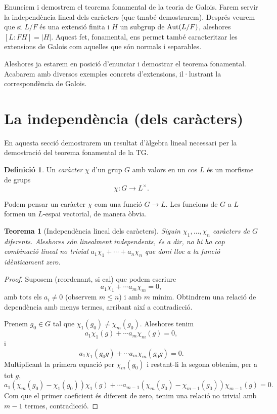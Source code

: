 \documentclass[
]{book}
\newtheorem{theorem}{Teorema}[chapter]
\theoremstyle{definition}
\newtheorem{definition}{Definició}[chapter]
\theoremstyle{definition}
\theoremstyle{definition}
\theoremstyle{definition}
\theoremstyle{remark}
\begin{document}
Enunciem i demostrem el teorema fonamental de la teoria de Galois. Farem
servir la independència lineal dels caràcters (que tmabé demostrarem). Després veurem
que si \(L / F\) és una extensió finita i \(H\) un subgrup de \(\operatorname{Aut}(L/F)\), aleshores
\([L \colon FH] = |H|\). Aquest fet, fonamental, ens permet també caracteritzar
les extensions de Galois com aquelles que són normals i separables.

Aleshores ja estarem en posició d'enunciar i demostrar el teorema fonamental. Acabarem
amb diversos exemples concrets d'extensions, il·lustrant la correspondència de Galois.

\hypertarget{la-independuxe8ncia-dels-caruxe0cters}{%
\section{La independència (dels caràcters)}\label{la-independuxe8ncia-dels-caruxe0cters}}

En aquesta secció demostrarem un resultat d'àlgebra lineal necessari per la demostració del teorema fonamental de la TG.

\begin{definition}
\protect\hypertarget{def:caracter}{}\label{def:caracter}Un \emph{caràcter} \(\chi\) d'un grup \(G\) amb valors en un cos \(L\) és un morfisme de grups
\[
\chi \colon G \to L^\times.
\]
\end{definition}

Podem pensar un caràcter \(\chi\) com una funció \(G\to L\). Les funcions de \(G\) a \(L\) formen un \(L\)-espai vectorial, de manera òbvia.

\begin{theorem}[Independència lineal dels caràcters]
\protect\hypertarget{thm:caracters-li}{}\label{thm:caracters-li}Siguin \(\chi_1,\ldots,\chi_n\) caràcters de \(G\) diferents. Aleshores són linealment independents, és a dir, no hi ha
cap combinació lineal no trivial \(a_1\chi_1+\cdots+a_n\chi_n\) que doni lloc a la funció idènticament zero.
\end{theorem}

\begin{proof}
Suposem (reordenant, si cal) que podem escriure
\[
a_1\chi_1 + \cdots a_m\chi_m = 0,
\]
amb tots els \(a_i\neq 0\) (observem \(m\leq n\)) i amb \(m\) mínim. Obtindrem una relació de dependència amb menys termes, arribant així a contradicció.

Prenem \(g_0\in G\) tal que \(\chi_1(g_0)\neq \chi_m(g_0)\). Aleshores tenim
\[
a_1\chi_1(g) + \cdots a_m\chi_m(g) = 0,
\]
i
\[
a_1\chi_1(g_0g) + \cdots a_m\chi_m(g_0g) = 0.
\]
Multiplicant la primera equació per \(\chi_m(g_0)\) i restant-li la segona obtenim, per a tot \(g\),
\[
a_1(\chi_m(g_0)-\chi_1(g_0)) \chi_1(g) + \cdots a_{m-1}(\chi_m(g_0)- \chi_{m-1}(g_0)) \chi_{m-1}(g) = 0.
\]
Com que el primer coeficient és diferent de zero, tenim una relació no trivial amb \(m-1\) termes, contradicció.
\end{proof}
\end{document}
